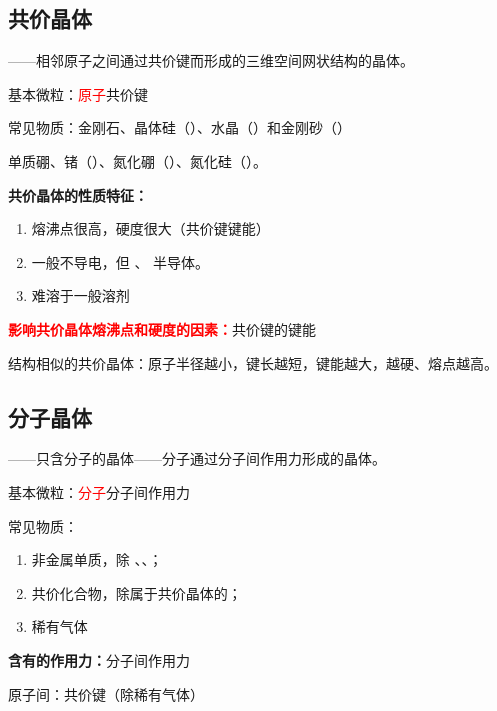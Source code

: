         \subsection{共价晶体}\label{subsec:共价晶体}

            ——相邻原子之间通过共价键而形成的三维空间网状结构的晶体。

            基本微粒：\textcolor{red}{原子}\qquad 共价键

            常见物质：金刚石、晶体硅（）、水晶（）和金刚砂（）

            单质硼、锗（）、氮化硼（）、氮化硅（）。

            \textbf{共价晶体的性质特征：}

            \begin{enumerate}
                \item 熔沸点很高，硬度很大（共价键键能）
                \item 一般不导电，但 、 半导体。
                \item 难溶于一般溶剂
            \end{enumerate}

            \textbf{\textcolor{red}{影响共价晶体熔沸点和硬度的因素：}}共价键的键能

            结构相似的共价晶体：原子半径越小，键长越短，键能越大，越硬、熔点越高。

        \subsection{分子晶体}\label{subsec:分子晶体}

            ——只含分子的晶体——分子通过分子间作用力形成的晶体。

            基本微粒：\textcolor{red}{分子}\qquad 分子间作用力

            常见物质：

            \begin{enumerate}
                \item 非金属单质，除 、、；
                \item 共价化合物，除属于共价晶体的；
                \item 稀有气体
            \end{enumerate}

            \textbf{含有的作用力：}分子间作用力

            原子间：共价键（除稀有气体）

